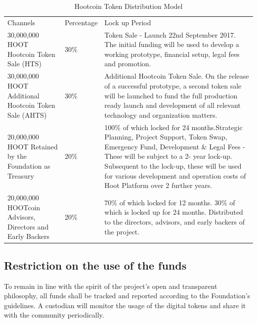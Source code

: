 \documentclass{article}
\begin{document}
\begin{table}[!htb]
\centering
\begin{tabular}{ |p{2.8cm}|p{2.5cm}|p{5cm}|}
\hline
\rowcolor{lightgray} \multicolumn{3}{|c|}{Hootcoin Token Distribution Model} \\
\hline
Channels & Percentage & Lock up Period  \\
\hline
30,000,000 HOOT  Hootcoin Token Sale (HTS) & 30\% & Token Sale - Launch 22nd September 2017. The initial funding will be used to develop a working prototype, financial setup, legal fees and promotion.
 \\
 \hline
30,000,000 HOOT Additional Hootcoin Token Sale (AHTS) & 30\% & Additional Hootcoin Token Sale. On the release of a successful prototype, a second token sale will be launched to fund the full production ready launch and development of all relevant technology and organization matters.
\\
\hline
20,000,000 HOOT Retained by the Foundation as Treasury & 20\% & 100\% of which locked for 24 months.Strategic Planning, Project Support, Token Swap, Emergency Fund, Development \& Legal Fees - These will be subject to a 2- year lock-up. Subsequent to the lock-up, these will be used for various development and operation costs of Hoot Platform over 2 further years.
\\
\hline
20,000,000 HOOTcoin Advisors, Directors and Early Backers & 20\% & 70\% of which locked for 12 months. 30\% of which is locked up for 24 months. Distributed to the directors, advisors, and early backers of the
 project.
\\
 \hline
\end{tabular}
\caption{Hootcoin Token Distribution Model}
\label{table:hoot_token_distribution_model}
\end{table}


\subsection{Restriction on the use of the funds} %
\label{sub:restriction_on_the_use_of_the_funds}
To remain in line with the spirit of the project’s open and transparent philosophy, all funds shall be tracked and reported according to the Foundation’s guidelines. A custodian will monitor the usage of the digital tokens and share it with the community periodically.
\end{document}
